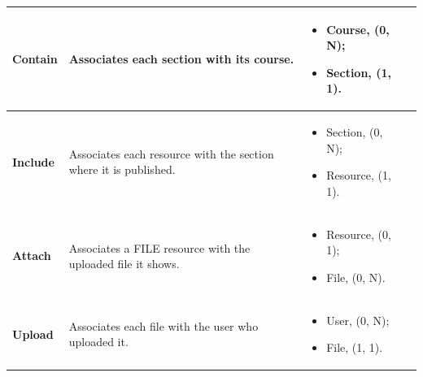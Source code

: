 {\begin{longtable}{|p{}|p{}|p{}|p{}|}
    \textbf{Contain} & Associates each section with its course. &
    \begin{itemize}[leftmargin=*,nosep,before=\vspace{-\baselineskip}\leavevmode,after=\vspace{-\baselineskip}]
        \item Course, (0, N);
        \item Section, (1, 1).
    \end{itemize}
    &
    
    \\ \hline

    \textbf{Include} & Associates each resource with the section where it is published. &
    \begin{itemize}[leftmargin=*,nosep,before=\vspace{-\baselineskip}\leavevmode,after=\vspace{-\baselineskip}]
        \item Section, (0, N);
        \item Resource, (1, 1).
    \end{itemize}
    &
    
    \\ \hline

    \textbf{Attach} & Associates a FILE resource with the uploaded file it shows. &
    \begin{itemize}[leftmargin=*,nosep,before=\vspace{-\baselineskip}\leavevmode,after=\vspace{-\baselineskip}]
        \item Resource, (0, 1);
        \item File, (0, N).
    \end{itemize}
    &
    
    \\ \hline

    \textbf{Upload} & Associates each file with the user who uploaded it. &
    \begin{itemize}[leftmargin=*,nosep,before=\vspace{-\baselineskip}\leavevmode,after=\vspace{-\baselineskip}]
        \item User, (0, N);
        \item File, (1, 1).
    \end{itemize}
    &
    
    \\ \hline


\end{longtable}}
